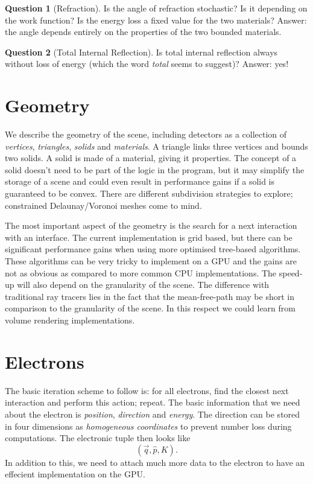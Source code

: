 \documentclass{article}
\theoremstyle{definition}
\newtheorem{question}{Question}
\begin{document}
\begin{question}[Refraction]
    Is the angle of refraction stochastic? Is it depending on the work function? Is the energy loss a fixed value for the two materials? Answer: the angle depends entirely on the properties of the two bounded materials.
\end{question}

\begin{question}[Total Internal Reflection]
    Is total internal reflection always without loss of energy (which the word \emph{total} seems to suggest)? Answer: yes!
\end{question}

\section{Geometry}
    We describe the geometry of the scene, including detectors as a collection of \emph{vertices}, \emph{triangles}, \emph{solids} and \emph{materials}. A triangle links three vertices and bounds two solids. A solid is made of a material, giving it properties. The concept of a solid doesn't need to be part of the logic in the program, but it may simplify the storage of a scene and could even result in performance gains if a solid is guaranteed to be convex. There are different subdivision strategies to explore; constrained Delaunay/Voronoi meshes come to mind.
    
    The most important aspect of the geometry is the search for a next interaction with an interface. The current implementation is grid based, but there can be significant performance gains when using more optimised tree-based algorithms. These algorithms can be very tricky to implement on a GPU and the gains are not as obvious as compared to more common CPU implementations. The speed-up will also depend on the granularity of the scene. The difference with traditional ray tracers lies in the fact that the mean-free-path may be short in comparison to the granularity of the scene. In this respect we could learn from volume rendering implementations.
    
\section{Electrons}
The basic iteration scheme to follow is: for all electrons, find the closest next interaction and perform this action; repeat. The basic information that we need about the electron is \emph{position}, \emph{direction} and \emph{energy}. The direction can be stored in four dimensions as \emph{homogeneous coordinates} to prevent number loss during computations. The electronic tuple then looks like
\[(\vec{q}, \hat{p}, K).\]
In addition to this, we need to attach much more data to the electron to have an effecient implementation on the GPU.
\end{document}
